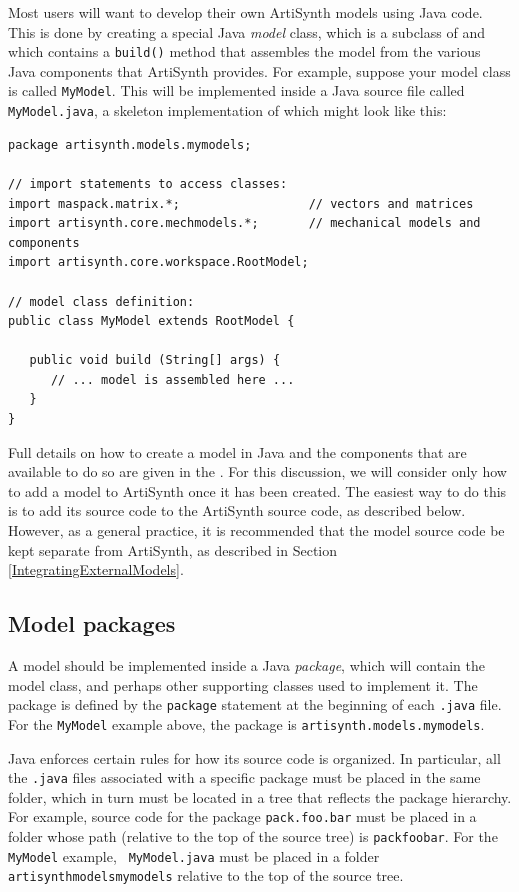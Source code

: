 Most users will want to develop their own ArtiSynth models using Java
code. This is done by creating a special Java {\it model} class, which
is a subclass of
 and which contains a
{\tt build()} method that assembles the model from the various Java
components that ArtiSynth provides. For example, suppose your model
class is called {\tt MyModel}. This will be implemented inside a Java
source file called {\tt MyModel.java}, a skeleton implementation of
which might look like this:
%
\begin{lstlisting}[]
package artisynth.models.mymodels;

// import statements to access classes:
import maspack.matrix.*;                  // vectors and matrices
import artisynth.core.mechmodels.*;       // mechanical models and components
import artisynth.core.workspace.RootModel;

// model class definition:
public class MyModel extends RootModel {

   public void build (String[] args) {
      // ... model is assembled here ...
   }
}
\end{lstlisting}
%
Full details on how to create a model in Java and the components that
are available to do so are given in
the\pdfbreak
{}. For this
discussion, we will consider only how to add a model to ArtiSynth once
it has been created. The easiest way to do this is to add its source
code to the ArtiSynth source code, as described below. However, as
a general practice, it is recommended that the model source code
be kept separate from ArtiSynth, as described in
Section \ref{IntegratingExternalModels}.

\subsection{Model packages}

A model should be implemented inside a Java {\it package}, which will
contain the model class, and perhaps other supporting classes used to
implement it. The package is defined by the {\tt package} statement at
the beginning of each {\tt .java} file. For the {\tt MyModel} example
above, the package is {\tt artisynth.models.mymodels}.

Java enforces certain rules for how its source code is organized.  In
particular, all the {\tt .java} files associated with a specific
package must be placed in the same folder, which in turn must be located in a
\directory{} tree that reflects the package hierarchy. For
example, source code for the package {\tt pack.foo.bar} must be placed
in a folder whose path (relative to the top of the source tree) is
{\tt pack\SEP foo\SEP bar}.  For the {\tt MyModel} example, {\tt
MyModel.java} must be placed in
a folder {\tt artisynth\SEP models\SEP mymodels} relative to the top
of the source tree.

